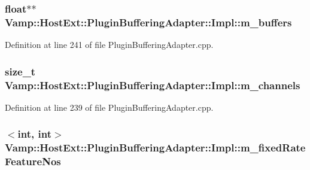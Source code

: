 \subsubsection[{\texorpdfstring{m\+\_\+buffers}{m_buffers}}]{\setlength{\rightskip}{0pt plus 5cm}float$\ast$$\ast$ Vamp\+::\+Host\+Ext\+::\+Plugin\+Buffering\+Adapter\+::\+Impl\+::m\+\_\+buffers\hspace{0.3cm}{\ttfamily [protected]}}\hypertarget{class_vamp_1_1_host_ext_1_1_plugin_buffering_adapter_1_1_impl_ad0b81884ecf1f01e8272667e59cce02e}{}\label{class_vamp_1_1_host_ext_1_1_plugin_buffering_adapter_1_1_impl_ad0b81884ecf1f01e8272667e59cce02e}


Definition at line 241 of file Plugin\+Buffering\+Adapter.\+cpp.

\subsubsection[{\texorpdfstring{m\+\_\+channels}{m_channels}}]{\setlength{\rightskip}{0pt plus 5cm}size\+\_\+t Vamp\+::\+Host\+Ext\+::\+Plugin\+Buffering\+Adapter\+::\+Impl\+::m\+\_\+channels\hspace{0.3cm}{\ttfamily [protected]}}\hypertarget{class_vamp_1_1_host_ext_1_1_plugin_buffering_adapter_1_1_impl_a3b8801196c981a9953f6f1fbf5a8aabd}{}\label{class_vamp_1_1_host_ext_1_1_plugin_buffering_adapter_1_1_impl_a3b8801196c981a9953f6f1fbf5a8aabd}


Definition at line 239 of file Plugin\+Buffering\+Adapter.\+cpp.

\subsubsection[{\texorpdfstring{m\+\_\+fixed\+Rate\+Feature\+Nos}{m_fixedRateFeatureNos}}]{$<${\bf int}, {\bf int}$>$ Vamp\+::\+Host\+Ext\+::\+Plugin\+Buffering\+Adapter\+::\+Impl\+::m\+\_\+fixed\+Rate\+Feature\+Nos\hspace{0.3cm}{\ttfamily [protected]}}\hypertarget{class_vamp_1_1_host_ext_1_1_plugin_buffering_adapter_1_1_impl_a8b61580f4e6a3d5502b54a53eb7c19d0}{}\label{class_vamp_1_1_host_ext_1_1_plugin_buffering_adapter_1_1_impl_a8b61580f4e6a3d5502b54a53eb7c19d0}


